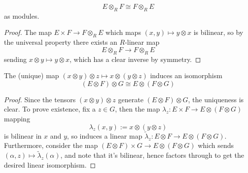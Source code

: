 \begin{prop}
    $$E \otimes _R F \cong F \otimes _R E$$
    as modules.
\end{prop}

\begin{proof}
    The map $E \times F \to F \otimes _RE$ which maps $(x,y) \mapsto y \otimes x$ is bilinear, so by the universal property there exists an $R$-linear map
    $$E \otimes _RF \to F \otimes _RE$$
    sending $x \otimes y \mapsto y \otimes x$, which has a clear inverse by symmetry.
\end{proof}

\begin{prop}
    The (unique) map $(x \otimes y) \otimes z \mapsto x \otimes (y \otimes z)$ induces an isomorphism
    $$(E \otimes F) \otimes G \cong E \otimes (F \otimes G)$$
\end{prop}

\begin{proof}
    Since the tensors $(x \otimes y) \otimes z$ generate $(E \otimes F) \otimes G$, the uniqueness is clear. To prove existence, fix a $z \in G$, then the map $\lambda_z: E \times F \to E \otimes (F \otimes G)$ mapping
    $$\lambda_z(x,y) := x \otimes (y \otimes z)$$
    is bilinear in $x$ and $y$, so induces a linear map $\tilde \lambda _z : E \otimes F \to E \otimes (F \otimes G)$. Furthermore, consider the map $(E \otimes F) \times G \to E \otimes (F \otimes G)$ which sends $(\alpha, z) \mapsto \tilde \lambda _z(\alpha)$, and note that it's bilinear, hence factors through to get the desired linear isomorphism.
\end{proof}

